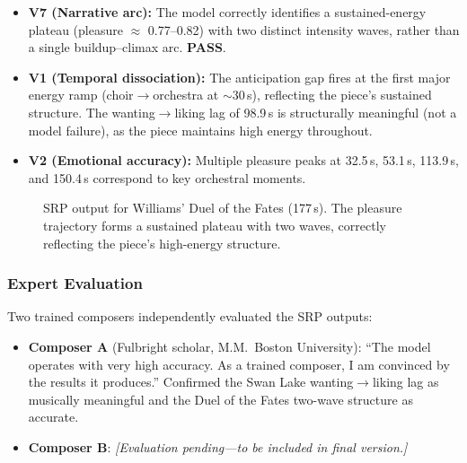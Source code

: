 \documentclass[10pt,twocolumn]{article}
\begin{document}
\begin{itemize}
\item \textbf{V7 (Narrative arc):} The model correctly identifies a sustained-energy plateau (pleasure $\approx$ 0.77--0.82) with two distinct intensity waves, rather than a single buildup--climax arc. \textbf{PASS}.
\item \textbf{V1 (Temporal dissociation):} The anticipation gap fires at the first major energy ramp (choir$\to$orchestra at $\sim$30\,s), reflecting the piece's sustained structure. The wanting$\to$liking lag of 98.9\,s is structurally meaningful (not a model failure), as the piece maintains high energy throughout.
\item \textbf{V2 (Emotional accuracy):} Multiple pleasure peaks at 32.5\,s, 53.1\,s, 113.9\,s, and 150.4\,s correspond to key orchestral moments.
\end{itemize}

\begin{figure}[t]
\centering
{}
\caption{SRP output for Williams' Duel of the Fates (177\,s). The pleasure trajectory forms a sustained plateau with two waves, correctly reflecting the piece's high-energy structure.}
\label{fig:duel}
\end{figure}

\subsubsection{Expert Evaluation}

Two trained composers independently evaluated the SRP outputs:

\begin{itemize}
\item \textbf{Composer A} (Fulbright scholar, M.M.\ Boston University): ``The model operates with very high accuracy. As a trained composer, I am convinced by the results it produces.'' Confirmed the Swan Lake wanting$\to$liking lag as musically meaningful and the Duel of the Fates two-wave structure as accurate.
\item \textbf{Composer B}: \textit{[Evaluation pending---to be included in final version.]}
\end{itemize}
\end{document}
